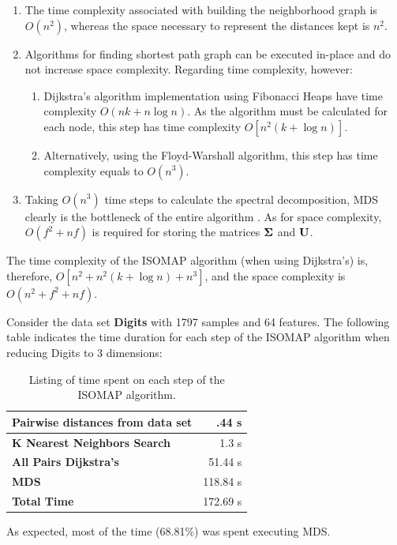 \begin{enumerate}
	\item The time complexity associated with building the neighborhood graph is $O(n^2)$, whereas the space necessary to represent the distances kept is $n^2$.
	\item Algorithms for finding shortest path graph can be executed in-place and do not increase space complexity. Regarding time complexity, however:
	\begin{enumerate}
		\item Dijkstra's algorithm implementation using Fibonacci Heaps have time complexity $O(nk + n \log n)$. As the algorithm must be calculated for each node, this step has time complexity $O[n^2(k + \log n)]$.
		\item Alternatively, using the Floyd-Warshall algorithm, this step has time complexity equals to $O(n^3)$.
	\end{enumerate}
	\item Taking $O(n^3)$ time steps to calculate the spectral decomposition, MDS clearly is the bottleneck of the entire algorithm \cite{cay2005, silva2002global}. As for space complexity, $O(f^2 + nf)$ is required for storing the matrices $\mathbf{\Sigma}$ and $\mathbf{U}$.
\end{enumerate}

The time complexity of the ISOMAP algorithm (when using Dijkstra's) is, therefore, $O[n^2 + n^2(k + \log n) + n^3]$, and the space complexity is $O(n^2 + f^2 + nf)$.

\begin{experiment}
	Consider the data set \textbf{Digits} with 1797 samples and 64 features. The following table indicates the time duration for each step of the ISOMAP algorithm when reducing Digits to 3 dimensions:

	\begin{table}[H]
		\centering
		\begin{tabular}{|l|r|}
			\hline
			\textbf{Pairwise distances from data set} & .44 s \\\hline
			\textbf{K Nearest Neighbors Search} & 1.3 s \\\hline
			\textbf{All Pairs Dijkstra's} & 51.44 s\\\hline
			\textbf{MDS} & 118.84 s \\\hline
			\textbf{Total Time} & 172.69 s \\\hline
		\end{tabular}

		\caption{Listing of time spent on each step of the ISOMAP algorithm.}
	\end{table}

	As expected, most of the time (68.81\%) was spent executing MDS.
\end{experiment}

